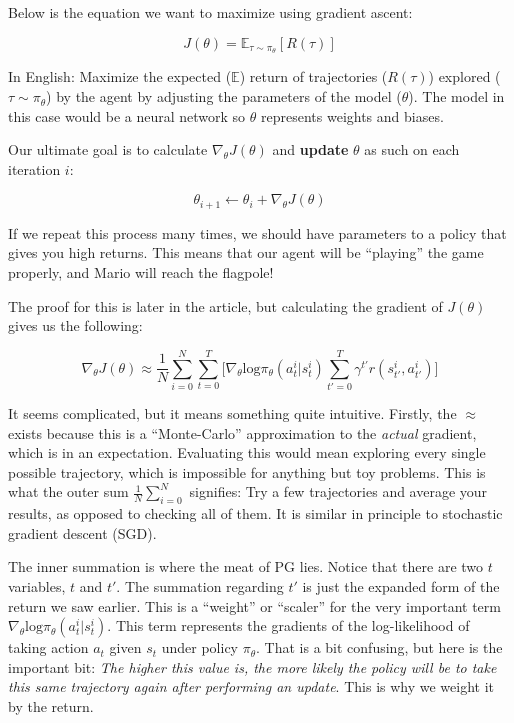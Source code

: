     Below is the equation we want to maximize using gradient ascent:

    $$J(\theta) = \mathbb{E}_{\tau \sim \pi_\theta} [R(\tau)]$$

    In English: Maximize the expected ($\mathbb{E}$) return of trajectories ($R(\tau)$) explored ($\tau \sim \pi_\theta$) by the agent by adjusting the parameters of the model ($\theta$). The model in this case would be a neural network so $\theta$ represents weights and biases. 
    
    Our ultimate goal is to calculate $\nabla_\theta J(\theta)$ and \textbf{update} $\theta$ as such on each iteration $i$:

    $$\theta_{i+1} \leftarrow \theta_i + \nabla_\theta J(\theta)$$

    If we repeat this process many times, we should have parameters to a policy that gives you high returns. This means that our agent will be ``playing'' the game properly, and Mario will reach the flagpole! 

    The proof for this is later in the article, but calculating the gradient of $J(\theta)$ gives us the following:

    $$\nabla_\theta J(\theta) \approx \frac{1}{N}\sum_{i=0}^N\sum_{t=0}^T\biggl[ \nabla_\theta \mathrm{log}\pi_\theta(a_t^i|s_t^i)\sum_{t'=0}^T \gamma^{t'} r(s_{t'}^i, a_{t'}^i)\biggr]$$

    It seems complicated, but it means something quite intuitive. Firstly, the $\approx$ exists because this is a ``Monte-Carlo'' approximation to the \textit{actual} gradient, which is in an expectation. Evaluating this would mean exploring every single possible trajectory, which is impossible for anything but toy problems. This is what the outer sum $\frac{1}{N}\sum_{i=0}^N$ signifies: Try a few trajectories and average your results, as opposed to checking all of them. It is similar in principle to stochastic gradient descent (SGD). 

    The inner summation is where the meat of PG lies. Notice that there are two $t$ variables, $t$ and $t'$. The summation regarding $t'$ is just the expanded form of the return we saw earlier. This is a ``weight'' or ``scaler'' for the very important term $\nabla_\theta \mathrm{log}\pi_\theta(a_t^i|s_t^i)$. This term represents the gradients of the log-likelihood of taking action $a_t$ given $s_t$ under policy $\pi_\theta$. That is a bit confusing, but here is the important bit: \textit{The higher this value is, the more likely the policy will be to take this same trajectory again after performing an update}. This is why we weight it by the return. 
    

